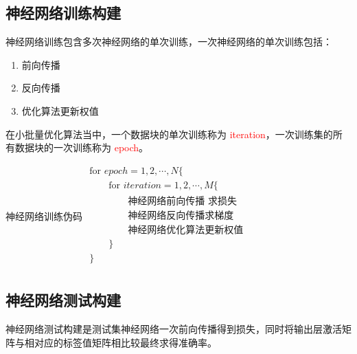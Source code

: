\documentclass[UTF-8]{progbookcn}
\begin{document}
\subsection{神经网络训练构建}
\begin{keypoint}
神经网络训练包含多次神经网络的单次训练，一次神经网络的单次训练包括：
\begin{enumerate}
  \item 前向传播
  \item 反向传播
  \item 优化算法更新权值
\end{enumerate}
\end{keypoint}

在小批量优化算法当中，一个数据块的单次训练称为  \textcolor{red}{iteration}，一次训练集的所有数据块的一次训练称为 \textcolor{red}{epoch}。
\begin{titledbox}{神经网络训练伪码}
$\begin{array}{l}
\text{for }epoch = 1,2,\cdots,N \{\\
\quad\quad\text{for }iteration = 1,2,\cdots,M \{\\
\quad\quad\quad\quad \text{神经网络前向传播 求损失}\\
\quad\quad\quad\quad \text{神经网络反向传播求梯度}\\
\quad\quad\quad\quad \text{神经网络优化算法更新权值}\\
\quad\quad\} \\
\} \\
 \end{array}$
\end{titledbox}


\subsection{神经网络测试构建}
\begin{keypoint}
神经网络测试构建是测试集神经网络一次前向传播得到损失，同时将输出层激活矩阵与相对应的标签值矩阵相比较最终求得准确率。
\end{keypoint}

\begin{table}[!h]
\centering
\caption{神经网络测试构建相关函数}
\end{table}
\end{document}
